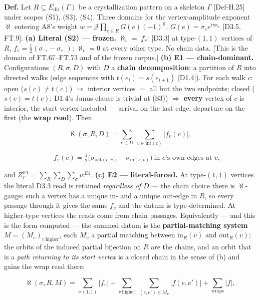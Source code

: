 \begin{definition}\label{tag:Def-H-27}
\textbf{Def.} Let $R\subseteq E_{\mathrm{dir}}(\Gamma)$ be a crystallization pattern on a skeleton $\Gamma$ [Def-H.25] under scopes (S1), (S3), (S4). Three domains for the vertex-amplitude exponent $\aleph$ entering A8's weight $w=\mathcal J\prod_{e\in R}G(e)(-1)^{\aleph}$, $G(e)=\sigma_e e^{i\pi\kappa_e}$ [D3.5, FT.9]: \textbf{(a) Literal (S2) — frozen.} $\aleph_v=|f_v|$ [D3.3] at type-$(1,1)$ vertices of $R$, $f_v=\tfrac12(\sigma_{\rightarrow}-\sigma_{\leftarrow})$; $\aleph_v=0$ at every other type. No chain data. [This is the domain of FT.67–FT.73 and of the frozen corpus.] \textbf{(b) E1 — chain-dominant.} Configurations $(R,\sigma,D)$ with $D$ a \textbf{chain decomposition}: a partition of $R$ into directed walks (edge sequences with $t(e_i)=s(e_{i+1})$ [D1.4]). For each walk $c$: open ($s(c)\ne t(c)$) $\Rightarrow$ interior vertices $=$ all but the two endpoints; closed ($s(c)=t(c)$; D1.4's Janus clause is trivial at (S3)) $\Rightarrow$ \textbf{every} vertex of $c$ is interior, the start vertex included — arrival on the last edge, departure on the first (the \textbf{wrap read}). Then

\[
\aleph(\sigma,R,D)=\sum_{c\in D}\ \sum_{v\in\mathrm{int}(c)}\bigl|f_v(c)\bigr|,
\]

\[
\qquad f_v(c)=\tfrac12\bigl(\sigma_{\mathrm{out}(c,v)}-\sigma_{\mathrm{in}(c,v)}\bigr)\ \text{in }c\text{'s own edges at }v,
\]

and $Z^{E1}_\Gamma=\sum_R\sum_D\sum_\sigma w^{E1}$. \textbf{(c) E2 — literal-forced.} At type-$(1,1)$ vertices the literal D3.3 read is retained \textit{regardless of $D$} — the chain choice there is $\aleph$-gauge: such a vertex has a unique in- and a unique out-edge in $R$, so every passage through it gives the same $f_v$ and the datum is type-determined. At higher-type vertices the reads come from chain passages. Equivalently — and this is the form computed — the summed datum is the \textbf{partial-matching system} $M=(M_v)_{v\ \mathrm{higher}}$, each $M_v$ a partial matching between $\mathrm{in}_R(v)$ and $\mathrm{out}_R(v)$; the orbits of the induced partial bijection on $R$ are the chains, and an orbit that is a \textit{path returning to its start vertex} is a closed chain in the sense of (b) and gains the wrap read there:

\[
\aleph(\sigma,R,M)=\sum_{v\ (1,1)}|f_v|+\sum_{v\ \mathrm{higher}}\ \sum_{(e,e')\in M_v}\bigl|f(e,e')\bigr|+\sum_{\mathrm{wraps}}|f|,
\]


\end{definition}
